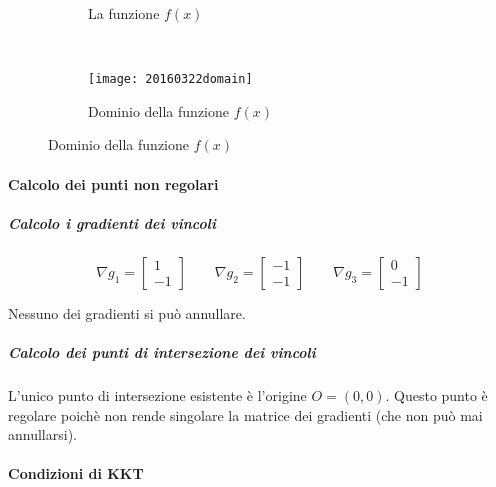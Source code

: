 \documentclass[\main/main.tex]{subfiles}
\begin{document}
\begin{figure}
  \begin{subfigure}{0.45\textwidth}
    \caption{La funzione $f(x)$}
    \label{func}
  \end{subfigure}
  ~
  \begin{subfigure}{0.45\textwidth}
    \texttt{[image: 20160322domain]}
    \caption{Dominio della funzione $f(x)$}
  \end{subfigure}
\end{figure}

\paragraph*{Calcolo dei punti non regolari}

\subparagraph*{Calcolo i gradienti dei vincoli}

\[
  \nabla g_1 = \begin{bmatrix}
    1 \\
    -1
  \end{bmatrix}
  \qquad
  \nabla g_2 = \begin{bmatrix}
    -1 \\
    -1
  \end{bmatrix}
  \qquad
  \nabla g_3 = \begin{bmatrix}
    0 \\
    -1
  \end{bmatrix}
\]

Nessuno dei gradienti si può annullare.

\subparagraph*{Calcolo dei punti di intersezione dei vincoli}
L'unico punto di intersezione esistente è l'origine $O=(0,0)$. Questo punto è regolare poichè non rende singolare la matrice dei gradienti (che non può mai annullarsi).

\paragraph*{Condizioni di KKT}
\end{document}
